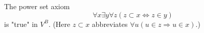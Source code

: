 The power set axiom
$$\forall x \exists y \forall z (z \subset x \Leftrightarrow z \in y)$$
is "true" in $V^B$. (Here $z \subset x$ abbreviates $\forall u (u \in z \Rightarrow u \in x)$.)